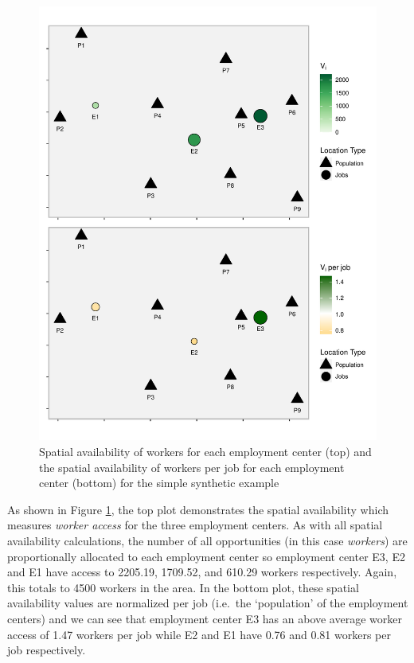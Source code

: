 \documentclass[]{elsarticle} %
\begin{document}
\begin{figure}
\includegraphics[width=1\linewidth]{Spatial-Availability_files/figure-latex/toy-example-availability-workers-per-job-1} \caption{\label{fig:toy-example-availability-workers-per-job} Spatial availability of workers for each employment center (top) and the spatial availability of workers per job for each employment center (bottom) for the simple synthetic example}\label{fig:toy-example-availability-workers-per-job}
\end{figure}

As shown in Figure \ref{fig:toy-example-availability-workers-per-job},
the top plot demonstrates the spatial availability which measures
\emph{worker access} for the three employment centers. As with all
spatial availability calculations, the number of all opportunities (in
this case \emph{workers}) are proportionally allocated to each
employment center so employment center E3, E2 and E1 have access to
2205.19, 1709.52, and 610.29 workers respectively. Again, this totals to
4500 workers in the area. In the bottom plot, these spatial availability
values are normalized per job (i.e.~the `population' of the employment
centers) and we can see that employment center E3 has an above average
worker access of 1.47 workers per job while E2 and E1 have 0.76 and 0.81
workers per job respectively.
\end{document}
